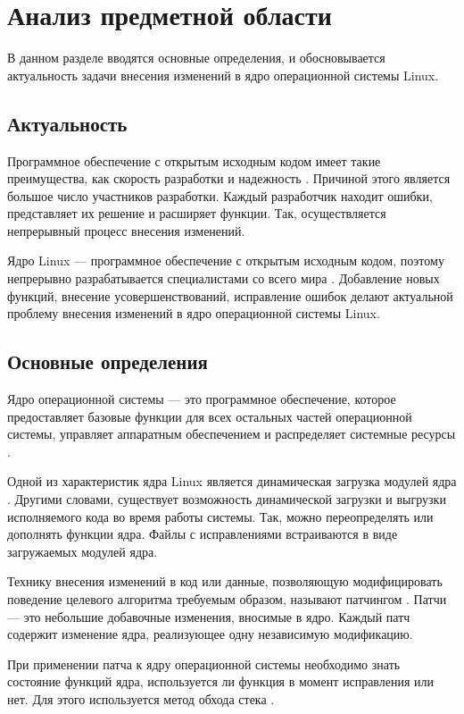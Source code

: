 \chapter{Анализ предметной области}

В данном разделе вводятся основные определения, и обосновывается актуальность задачи внесения изменений в ядро операционной системы Linux.

\section{Актуальность}

Программное обеспечение с открытым исходным кодом имеет такие преимущества, как скорость разработки и надежность \cite{open-source}. Причиной этого является большое число участников разработки. Каждый разработчик находит ошибки, представляет их решение и расширяет функции. Так, осуществляется непрерывный процесс внесения изменений.

Ядро Linux --- программное обеспечение с открытым исходным кодом, поэтому непрерывно разрабатывается специалистами со всего мира \cite{statistics}. Добавление новых функций, внесение усовершенствований, исправление ошибок делают актуальной проблему внесения изменений в ядро операционной системы Linux.

\section{Основные определения}

Ядро операционной системы --- это программное обеспечение, которое предоставляет базовые функции для всех остальных частей операционной системы, управляет аппаратным обеспечением и распределяет системные ресурсы \cite{linux}.

Одной из характеристик ядра Linux является динамическая загрузка модулей ядра \cite{modules}. Другими словами, существует возможность динамической загрузки и выгрузки исполняемого кода во время работы системы. Так, можно переопределять или дополнять функции ядра. Файлы с исправлениями встраиваются в виде загружаемых модулей ядра.

Технику внесения изменений в код или данные, позволяющую модифицировать поведение целевого алгоритма требуемым образом, называют патчингом \cite{patching}. Патчи --- это небольшие добавочные изменения, вносимые в ядро. Каждый патч содержит изменение ядра, реализующее одну независимую модификацию.

При применении патча к ядру операционной системы необходимо знать состояние функций ядра, используется ли функция в момент исправления или нет. Для этого используется метод обхода стека \cite{lucos}.

